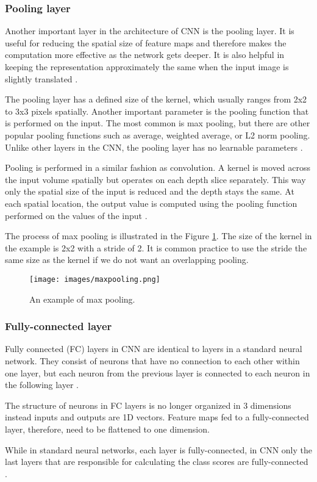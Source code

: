 \subsubsection{Pooling layer}

Another important layer in the architecture of CNN is the pooling layer. It is useful for reducing the spatial size of feature maps and therefore makes the computation more effective as the network gets deeper. It is also helpful in keeping the representation approximately the same when the input image is slightly translated \cite{Goodfellow-et-al-2016}.

The pooling layer has a defined size of the kernel, which usually ranges from 2x2 to 3x3 pixels spatially. Another important parameter is the pooling function that is performed on the input. The most common is max pooling, but there are other popular pooling functions such as average, weighted average, or L2 norm pooling. 
Unlike other layers in the CNN, the pooling layer has no learnable parameters \cite{standford}.

Pooling is performed in a similar fashion as convolution. A kernel is moved across the input volume spatially but operates on each depth slice separately. This way only the spatial size of the input is reduced and the depth stays the same. At each spatial location, the output value is computed using the pooling function performed on the values of the input \cite{standford}.

The process of max pooling is illustrated in the Figure \ref{img:maxpool0}. The size of the kernel in the example is 2x2 with a stride of 2. It is common practice to use the stride the same size as the kernel if we do not want an overlapping pooling.  

\begin{figure}[h]
    \centering
    \texttt{[image: images/maxpooling.png]}
    \caption{An example of max pooling.}
    \label{img:maxpool0}
\end{figure}

\subsubsection{Fully-connected layer}
Fully connected (FC) layers in CNN are identical to layers in a standard neural network. They consist of neurons that have no connection to each other within one layer, but each neuron from the previous layer is connected to each neuron in the following layer \cite{Goodfellow-et-al-2016}.

The structure of neurons in FC layers is no longer organized in 3 dimensions instead inputs and outputs are 1D vectors. Feature maps fed to a fully-connected layer, therefore, need to be flattened to one dimension.

While in standard neural networks, each layer is fully-connected, in CNN only the last layers that are responsible for calculating the class scores are fully-connected \cite{standford}.
